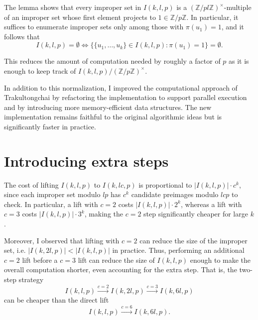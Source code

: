 \documentclass[10pt,leqno]{amsart}
\newcommand{\Int}[1]{\mathbb Z / #1 \mathbb Z}
\newcommand{\Unit}[1]{(\Int{#1})^\times}
\begin{document}
The lemma shows that every improper set in $I(k, l, p)$ is a $\Unit{pl}$-multiple 
of an improper set whose first element projects to $1 \in \Int{p}$. In particular, it suffices to enumerate improper 
sets only among those with $\pi(u_1) = 1$, and it follows that 
\[
  I(k, l, p) = \emptyset \iff \{ \{u_1, \dots, u_k\} \in I(k,l,p) : \pi(u_1) = 1 \} = \emptyset.
\]

This reduces the amount of computation needed by roughly a factor of $p$ as it is enough to keep track of 
$I(k, l, p)/\Unit{p}$.

In addition to this normalization, I improved the computational approach of
Trakultongchai by refactoring the implementation to support parallel
execution and by introducing more memory-efficient data structures.  The new
implementation remains faithful to the original algorithmic ideas but is
significantly faster in practice.

\section*{Introducing extra steps}
The cost of lifting $I(k, l, p)$ to $I(k, lc, p)$ is proportional to $|I(k, l, p)| \cdot c^k$,
since each improper set modulo $lp$ has $c^k$ candidate preimages modulo $lcp$ to check.
In particular, a lift with $c = 2$ costs $|I(k,l,p)| \cdot 2^k$, whereas a lift with $c = 3$ 
costs $|I(k,l,p)| \cdot 3^k$, making the $c = 2$ step significantly cheaper for large $k$.

Moreover, I observed that lifting with $c = 2$ can reduce the size of the improper set, 
i.e. $|I(k, 2l, p)| < |I(k, l, p)|$ in practice. Thus, performing an additional 
$c = 2$ lift before a $c = 3$ lift can reduce the size of $I(k, l, p)$ enough to make the 
overall computation shorter, even accounting for the extra step. That is, the two-step 
strategy
\[
  I(k, l, p) \xrightarrow{c=2} I(k, 2l, p) \xrightarrow{c=3} I(k, 6l, p)
\]
can be cheaper than the direct lift
\[
  I(k, l, p) \xrightarrow{c=6} I(k, 6l, p).
\]
\end{document}
